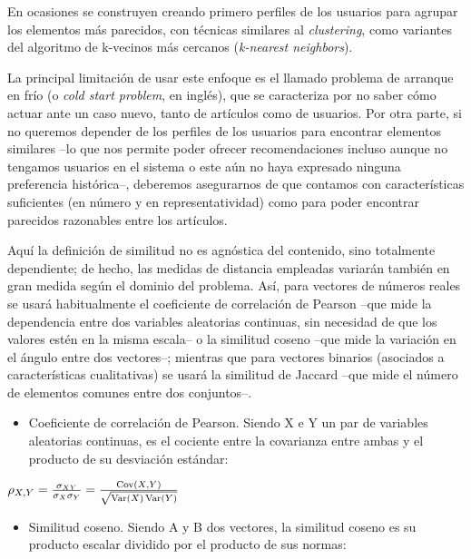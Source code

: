En ocasiones se construyen creando primero perfiles de los usuarios para agrupar los elementos más parecidos, con técnicas similares al \textit{clustering}, como variantes del algoritmo de k-vecinos más cercanos (\textit{k-nearest neighbors}).

La principal limitación de usar este enfoque es el llamado problema de arranque en frío (o \textit{cold start problem}, en inglés), que se caracteriza por no saber cómo actuar ante un caso nuevo, tanto de artículos como de usuarios. Por otra parte, si no queremos depender de los perfiles de los usuarios para encontrar elementos similares –lo que nos permite poder ofrecer recomendaciones incluso aunque no tengamos usuarios en el sistema o este aún no haya expresado ninguna preferencia histórica–, deberemos asegurarnos de que contamos con características suficientes (en número y en representatividad) como para poder encontrar parecidos razonables entre los artículos.

Aquí la definición de similitud no es agnóstica del contenido, sino totalmente dependiente; de hecho, las medidas de distancia empleadas variarán también en gran medida según el dominio del problema. Así, para vectores de números reales se usará habitualmente el coeficiente de correlación de Pearson –que mide la dependencia entre dos variables aleatorias continuas, sin necesidad de que los valores estén en la misma escala– o la similitud coseno –que mide la variación en el ángulo entre dos vectores–; mientras que para vectores binarios (asociados a características cualitativas) se usará la similitud de Jaccard –que mide el número de elementos comunes entre dos conjuntos–.

\begin{itemize}
    \item Coeficiente de correlación de Pearson. Siendo X e Y un par de variables aleatorias continuas, es el cociente entre la covarianza entre ambas y el producto de su desviación estándar:
\end{itemize}

$\rho_{X,Y}={\sigma_{XY} \over \sigma_X \sigma_Y} =\frac{\operatorname{Cov}(X,Y)}{\sqrt{\operatorname{Var}(X)\operatorname{Var}(Y)}}$

\begin{itemize}
    \item Similitud coseno. Siendo A y B dos vectores, la similitud coseno es su producto escalar dividido por el producto de sus normas:
\end{itemize}


